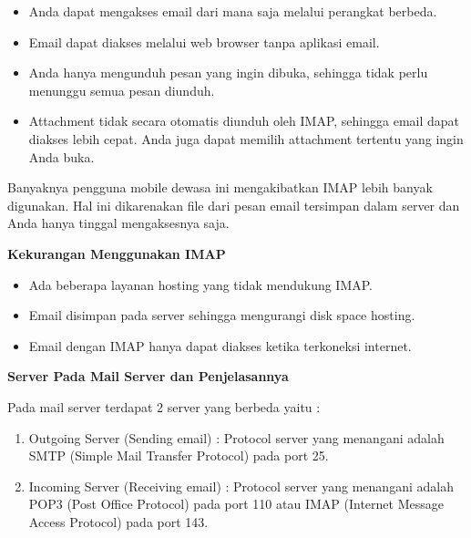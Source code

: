 \noindent 
\begin{itemize}
\item Anda dapat mengakses email dari mana saja melalui perangkat berbeda. \par
\noindent 
\item Email dapat diakses melalui web browser tanpa aplikasi email. \par
\noindent 
\item Anda hanya mengunduh pesan yang ingin dibuka, sehingga tidak perlu menunggu semua pesan diunduh. \par
\noindent 
\item Attachment tidak secara otomatis diunduh oleh IMAP, sehingga email dapat diakses lebih cepat. Anda juga dapat memilih attachment tertentu yang ingin Anda buka.\end{itemize}
 \par
Banyaknya pengguna mobile dewasa ini mengakibatkan IMAP lebih banyak digunakan. Hal ini dikarenakan file dari pesan email tersimpan dalam server dan Anda hanya tinggal mengaksesnya saja. \par
\vspace{12pt}
\textbf{Kekurangan Menggunakan IMAP} \par
\noindent 
\begin{itemize}
\item Ada beberapa layanan hosting yang tidak mendukung IMAP. \par
\noindent 
\item Email disimpan pada server sehingga mengurangi disk space hosting. \par
\noindent 
\item Email dengan IMAP hanya dapat diakses ketika terkoneksi internet.\end{itemize}
 \par
\vspace{12pt}
\noindent 
\textbf{Server Pada Mail Server dan Penjelasannya} \par
\noindent 
Pada mail server terdapat 2 server yang berbeda yaitu : \par
\noindent 
\begin{enumerate}
\item Outgoing Server (Sending email) : Protocol server yang menangani adalah SMTP (Simple Mail Transfer Protocol) pada port 25. \par
\noindent 
\item Incoming Server (Receiving email) : Protocol server yang menangani adalah POP3 (Post Office Protocol) pada port 110 atau IMAP (Internet Message Access Protocol) pada port 143.\end{enumerate}
